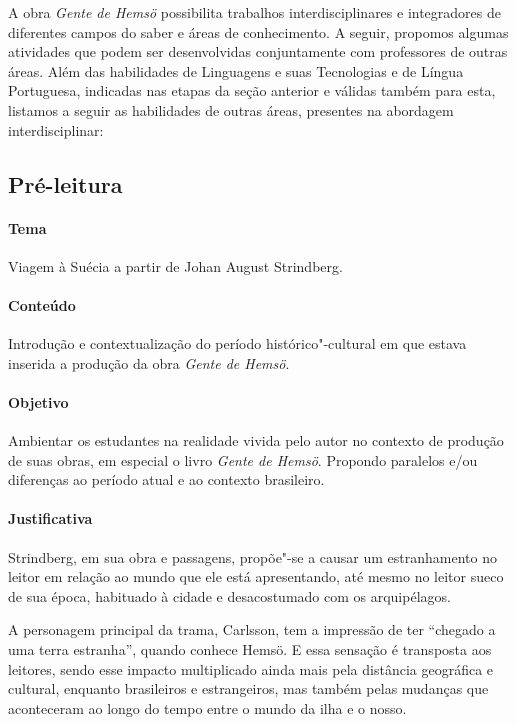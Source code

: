 \documentclass[12pt]{extarticle}
\begin{document}

A obra \emph{Gente de Hemsö} possibilita trabalhos interdisciplinares e
integradores de diferentes campos do saber e áreas de conhecimento. A
seguir, propomos algumas atividades que podem ser desenvolvidas
conjuntamente com professores de outras áreas. Além das habilidades de
Linguagens e suas Tecnologias e de Língua Portuguesa, indicadas nas
etapas da seção anterior e válidas também para esta, listamos a seguir
as habilidades de outras áreas, presentes na abordagem interdisciplinar:

\subsection{Pré-leitura}

\paragraph{Tema} Viagem à Suécia a partir de Johan August Strindberg.

\paragraph{Conteúdo} Introdução e contextualização do período histórico"-cultural 
em que estava inserida a produção da obra \emph{Gente de Hemsö}.

\paragraph{Objetivo} Ambientar os estudantes na realidade vivida pelo autor 
no contexto de produção de suas obras, em especial o livro \emph{Gente de Hemsö}. 
Propondo paralelos e/ou diferenças ao período atual e ao contexto brasileiro. 

\paragraph{Justificativa} Strindberg, em sua obra e passagens, propõe"-se a causar um
estranhamento no leitor em relação ao mundo que ele está
apresentando, até mesmo no leitor sueco de sua época, habituado à
cidade e desacostumado com os arquipélagos.

A personagem principal da trama, Carlsson, tem a impressão
de ter “chegado a uma terra estranha”, quando conhece Hemsö. E essa sensação é transposta 
aos leitores, sendo esse impacto multiplicado ainda mais pela distância geográfica e cultural, 
enquanto brasileiros e estrangeiros, mas também pelas mudanças que aconteceram ao longo do tempo 
entre o mundo da ilha e o nosso.
\end{document}
